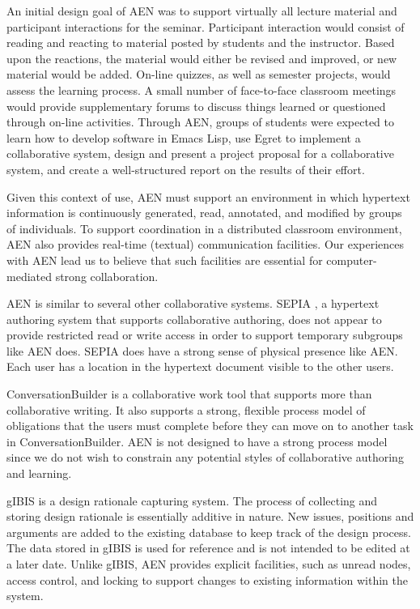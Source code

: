 An initial design goal of AEN was to support virtually all lecture material
and participant interactions for the seminar.  Participant interaction
would consist of reading and reacting to material posted by students and
the instructor.  Based upon the reactions, the material would either be
revised and improved, or new material would be added. On-line quizzes, as
well as semester projects, would assess the learning process. A small
number of face-to-face classroom meetings would provide supplementary
forums to discuss things learned or questioned through on-line activities.
Through AEN, groups of students were expected to learn how to develop
software in Emacs Lisp, use Egret to implement a collaborative system,
design and present a project proposal for a collaborative system, and
create a well-structured report on the results of their effort.

Given this context of use, AEN must support an environment in which
hypertext information is continuously generated, read, annotated, and
modified by groups of individuals.  To support coordination in a
distributed classroom environment, AEN also provides real-time (textual)
communication facilities.  Our experiences with AEN lead us to believe that
such facilities are essential for computer-mediated strong collaboration.

AEN is similar to several other collaborative systems.  SEPIA
\cite{Haake92}, a hypertext authoring system that supports collaborative
authoring, does not appear to provide restricted read or write access in
order to support temporary subgroups like AEN does.  SEPIA does have a
strong sense of physical presence like AEN.  Each user has a location in
the hypertext document visible to the other users.

ConversationBuilder \cite{Kaplan92} is a collaborative work tool that supports
more than collaborative writing.  It also supports a strong, flexible
process model of obligations that the users must complete before they can
move on to another task in ConversationBuilder.  AEN is not designed to
have a strong process model since we do not wish to constrain any potential
styles of collaborative authoring and learning.

gIBIS \cite{Conklin88} is a design rationale capturing system.  The process
of collecting and storing design rationale is essentially additive in
nature.  New issues, positions and arguments are added to the existing
database to keep track of the design process.  The data stored in gIBIS is
used for reference and is not intended to be edited at a later date.  Unlike gIBIS,
AEN provides explicit facilities, such as unread nodes, access control, and
locking to support changes to existing information within the system.

